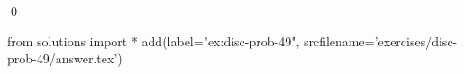 
\begin{ex} 
  \label{ex:disc-prob-49}
  
  \qed
\end{ex} 
\begin{python0}
from solutions import *
add(label="ex:disc-prob-49",
    srcfilename='exercises/disc-prob-49/answer.tex') 
\end{python0}
